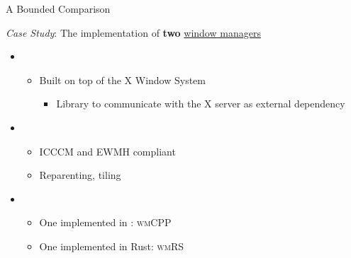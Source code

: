\begin{secframe}{A Bounded Comparison}

    \textit{Case Study}: The implementation of \textbf{two} \underline{window managers}

    \begin{itemize}
        \item {}
            \begin{itemize}
                \item Built on top of the X Window System
                    \begin{itemize}
                        \item Library to communicate with the X server as external dependency
                    \end{itemize}
            \end{itemize}
        \item {}
            \begin{itemize}
                \item ICCCM and EWMH compliant
                \item Reparenting, tiling
            \end{itemize}
        \item {}
            \begin{itemize}
                \item One implemented in \cpp: \textsc{wmCPP}
                \item One implemented in Rust: \textsc{wmRS}
            \end{itemize}
    \end{itemize}

    \vfill

\end{secframe}
